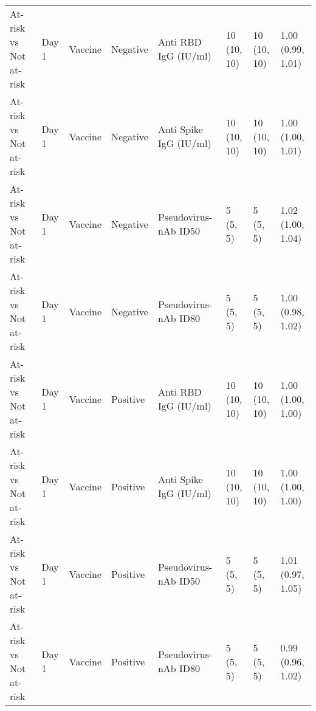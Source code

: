 \documentclass[]{book}
\theoremstyle{definition}
\theoremstyle{definition}
\theoremstyle{definition}
\newcommand{\1}{\mathbbm{1}}
\begin{document}
\begin{landscape}
\begin{ThreePartTable}
\begin{longtable}[t]{>{\raggedright\arraybackslash}p{2.7cm}lllllll}
At-risk vs Not at-risk & Day 1 & Vaccine & Negative & Anti RBD IgG (IU/ml) & \makecell[l]{10\\(10, 10)} & \makecell[l]{10\\(10, 10)} & \makecell[l]{1.00\\(0.99, 1.01)}\\
At-risk vs Not at-risk & Day 1 & Vaccine & Negative & Anti Spike IgG (IU/ml) & \makecell[l]{10\\(10, 10)} & \makecell[l]{10\\(10, 10)} & \makecell[l]{1.00\\(1.00, 1.01)}\\
\addlinespace
At-risk vs Not at-risk & Day 1 & Vaccine & Negative & Pseudovirus-nAb ID50 & \makecell[l]{5\\(5, 5)} & \makecell[l]{5\\(5, 5)} & \makecell[l]{1.02\\(1.00, 1.04)}\\
At-risk vs Not at-risk & Day 1 & Vaccine & Negative & Pseudovirus-nAb ID80 & \makecell[l]{5\\(5, 5)} & \makecell[l]{5\\(5, 5)} & \makecell[l]{1.00\\(0.98, 1.02)}\\
At-risk vs Not at-risk & Day 1 & Vaccine & Positive & Anti RBD IgG (IU/ml) & \makecell[l]{10\\(10, 10)} & \makecell[l]{10\\(10, 10)} & \makecell[l]{1.00\\(1.00, 1.00)}\\
At-risk vs Not at-risk & Day 1 & Vaccine & Positive & Anti Spike IgG (IU/ml) & \makecell[l]{10\\(10, 10)} & \makecell[l]{10\\(10, 10)} & \makecell[l]{1.00\\(1.00, 1.00)}\\
At-risk vs Not at-risk & Day 1 & Vaccine & Positive & Pseudovirus-nAb ID50 & \makecell[l]{5\\(5, 5)} & \makecell[l]{5\\(5, 5)} & \makecell[l]{1.01\\(0.97, 1.05)}\\
\addlinespace
At-risk vs Not at-risk & Day 1 & Vaccine & Positive & Pseudovirus-nAb ID80 & \makecell[l]{5\\(5, 5)} & \makecell[l]{5\\(5, 5)} & \makecell[l]{0.99\\(0.96, 1.02)}\\

\end{longtable}
\end{ThreePartTable}
\end{landscape}
\end{document}
